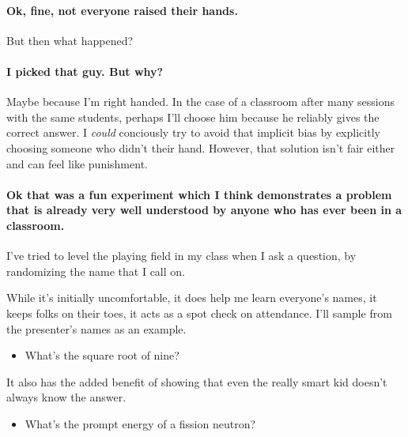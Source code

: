 \documentclass[11pt]{article}
\begin{document}
          \paragraph{Ok, fine, not everyone raised their hands.} But then what 
          happened?

          \paragraph{I picked that guy. But why?} Maybe because I'm right 
          handed. In the case of a classroom after many sessions with the same 
          students, perhaps I'll choose him because he reliably gives 
          the correct answer.
          I \emph{could} conciously try to avoid that implicit bias by  
          explicitly choosing someone who didn't their hand. However, 
          that solution isn't fair either and can feel like punishment. 
          
          \paragraph{Ok that was a fun experiment which I think 
          demonstrates a problem that is already very well understood by anyone 
          who has ever been in a classroom.} 

          I've tried to level the playing field in my class when I ask a 
          question, by randomizing the name that I call on. 

          While it's initially uncomfortable, it does help me learn everyone's 
          names, it keeps folks on their toes, it acts as a spot check on 
          attendance.  I'll sample from the presenter's names as an example.

          \begin{itemize}
                  \item What's the square root of nine?
          \end{itemize} 
          It also has the added benefit of showing that even the really smart kid doesn't always know the answer.
          \begin{itemize}
                  \item What's the prompt energy of a fission neutron?
          \end{itemize} 



          
          

          
\end{document}
